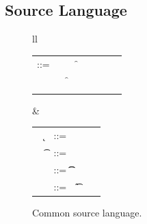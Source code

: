 \documentclass[a4paper,USenglish]{tex/lipics-v2016}
\begin{document}
\subsection{Source Language}

\begin{figure}[!h]\hrulefill
	
	\begin{tabular}{ll}
		\begin{minipage}{6cm}\begin{tabular}{@{}l@{~}l@{}l@{}l@{}l@{}l@{}l@{}l}
				\e\hspace{.1cm} ::= & \hspace{.2cm} \x        
				&\B \this         
				&\B \FRead\f \\    
				&
				&\B \FWrite\f\e
				&\B \Call\e\m\e \\
				& 
				&\B \that      
				&\B \New\C{\e[1]..}  
		\end{tabular}\end{minipage}&
		\begin{minipage}{5cm}\begin{tabular}{l@{~}l@{}l@{}l}
				~ \k &::= \Class \C {\fd[1]..}{\md[1]..} \\
				~ \t&::= ~ \any  \B   \C  \\ 
				\md &::= \Mdef\m\x\t\t\e \\
				~\fd&::= ~ \Fdef\f\t \\ 
		\end{tabular}\end{minipage} 
	\end{tabular}
	\vspace{2mm} 

\hrulefill

        \caption{Common source language.}\label{f:sourcesyntax}
\end{figure}
\end{document}
